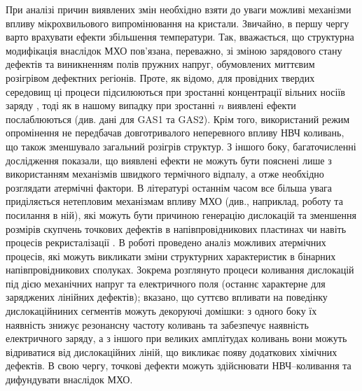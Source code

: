 \documentclass[a4paper,14pt,oneside,openany]{memoir}
\begin{document}
При аналізі причин виявлених змін необхідно взяти до уваги можливі механізми впливу
мікрохвильового випромінювання на кристали.
Звичайно, в першу чергу варто врахувати ефекти збільшення температури.
Так, вважається, що  структурна модифікація внаслідок МХО пов'язана, переважно,
зі зміною зарядового стану дефектів та виникненням полів пружних напруг, обумовлених миттєвим розігрівом дефектних регіонів.
Проте, як відомо, для провідних твердих середовищ ці процеси підсилюються при зростанні концентрації вільних носіїв заряду \cite{MW:Rev}, тоді як в нашому випадку при зростанні $n$ виявлені ефекти послаблюються (див. дані для GAS1 та GAS2).
Крім того, використаний режим опромінення не передбачав довготривалого неперевного впливу НВЧ коливань, що також зменшувало загальний розігрів структур.
З іншого боку, багаточисленні дослідження показали, що виявлені ефекти не можуть бути пояснені лише з використанням механізмів швидкого термічного відпалу, а отже необхідно розглядати атермічні фактори.
В літературі останнім часом все більша увага приділяється нетепловим механізмам впливу МХО (див., наприклад, роботу \cite{MW:Si2018} та посилання в ній), які можуть бути причиною генерацію дислокацій та зменшення розмірів скупчень точкових дефектів в напівпровідникових пластинах \cite{Konakova2007JTF} чи навіть процесів рекристалізації \cite{MW:Si2018}.
В роботі \cite{Konakova2007JTF} проведено аналіз можливих атермічних процесів, які можуть викликати зміни структурних характеристик в бінарних напівпровідникових сполуках.
Зокрема розглянуто процеси коливання дислокацій під дією механічних напруг та електричного поля (останнє характерне для заряджених лінійних дефектів);
вказано, що суттєво впливати на поведінку дислокаційниних сегментів можуть декоруючі домішки:
з одного боку їх наявність знижує резонансну частоту коливань та забезпечує наявність електричного заряду,
а з іншого при великих амплітудах коливань вони можуть відриватися від дислокаційних ліній, що викликає появу додаткових хімічних дефектів.
В свою чергу, точкові дефекти можуть здійснювати НВЧ--коливання та дифундувати внаслідок МХО.
\end{document}
